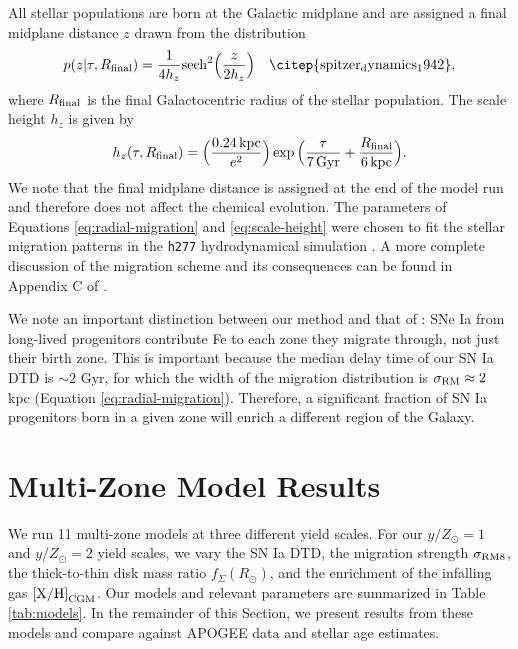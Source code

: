 \documentclass[twocolumn,twocolappendix,linenumbers]{aastex631}
\newcommand{\yZ}[1]{$y/Z_\odot=#1$}
\newcommand{\kpc}{\,{\rm kpc}}
\begin{document}
All stellar populations are born at the Galactic midplane and are assigned a final midplane distance $z$ drawn from the distribution
\begin{equation}
    p(z|\tau,R_{\rm final}) = \frac{1}{4 h_z} {\rm sech}^2\Big(\frac{z}{2 h_z}\Big)\quad 
    {\rm \citep{spitzer_dynamics_1942}},
    \label{eq:sech-pdf}
\end{equation}
where $R_{\rm final}$ is the final Galactocentric radius of the stellar population. The scale height $h_z$ is given by
\begin{equation}
    h_z(\tau,R_{\rm final}) = \Big(\frac{0.24\kpc}{e^2}\Big) \exp\Big(\frac{\tau}{7\,{\rm Gyr}} + \frac{R_{\rm final}}{6\kpc}\Big).
    \label{eq:scale-height}
\end{equation}
We note that the final midplane distance is assigned at the end of the model run and therefore does not affect the chemical evolution. The parameters of Equations \ref{eq:radial-migration} and \ref{eq:scale-height} were chosen to fit the stellar migration patterns in the {\tt h277} hydrodynamical simulation \citep{christensen_implementing_2012}. A more complete discussion of the migration scheme and its consequences can be found in Appendix C of \citet{dubay_galactic_2024}.

We note an important distinction between our method and that of \citet{spitoni_effect_2015}: SNe Ia from long-lived progenitors contribute Fe to each zone they migrate through, not just their birth zone. This is important because the median delay time of our SN Ia DTD is $\sim2$ Gyr, for which the width of the migration distribution is $\sigma_{\rm RM}\approx2$ kpc (Equation \ref{eq:radial-migration}). Therefore, a significant fraction of SN Ia progenitors born in a given zone will enrich a different region of the Galaxy.

\section{Multi-Zone Model Results}
\label{sec:multizone-results}

We run 11 multi-zone models at three different yield scales. For our \yZ{1} and \yZ{2} yield scales, we vary the SN Ia DTD, the migration strength $\sigma_{\rm RM8}$, the thick-to-thin disk mass ratio $f_\Sigma(R_\odot)$, and the enrichment of the infalling gas ${\rm [X/H]}_{\rm CGM}$. Our models and relevant parameters are summarized in Table \ref{tab:models}. In the remainder of this Section, we present results from these models and compare against APOGEE data and stellar age estimates.
\end{document}
